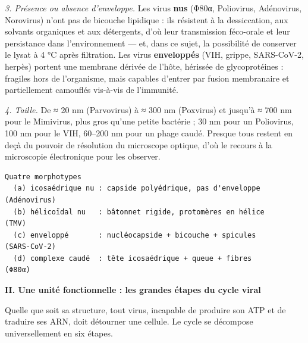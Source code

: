 \documentclass[11pt,a4paper]{article}
\begin{document}
\emph{3. Présence ou absence d'enveloppe.} Les virus \textbf{nus} (Φ80α, Poliovirus, Adénovirus, Norovirus) n'ont pas de bicouche lipidique : ils résistent à la dessiccation, aux solvants organiques et aux détergents, d'où leur transmission féco-orale et leur persistance dans l'environnement --- et, dans ce sujet, la possibilité de conserver le lysat à 4 °C après filtration. Les virus \textbf{enveloppés} (VIH, grippe, SARS-CoV-2, herpès) portent une membrane dérivée de l'hôte, hérissée de glycoprotéines : fragiles hors de l'organisme, mais capables d'entrer par fusion membranaire et partiellement camouflés vis-à-vis de l'immunité.

\emph{4. Taille.} De ≈ 20 nm (Parvovirus) à ≈ 300 nm (Poxvirus) et jusqu'à ≈ 700 nm pour le Mimivirus, plus gros qu'une petite bactérie ; 30 nm pour un Poliovirus, 100 nm pour le VIH, 60--200 nm pour un phage caudé. Presque tous restent en deçà du pouvoir de résolution du microscope optique, d'où le recours à la microscopie électronique pour les observer.

\begin{lstlisting}
Quatre morphotypes
  (a) icosaédrique nu : capside polyédrique, pas d'enveloppe        (Adénovirus)
  (b) hélicoïdal nu   : bâtonnet rigide, protomères en hélice        (TMV)
  (c) enveloppé       : nucléocapside + bicouche + spicules          (SARS-CoV-2)
  (d) complexe caudé  : tête icosaédrique + queue + fibres           (Φ80α)
\end{lstlisting}

\textbf{II. Une unité fonctionnelle : les grandes étapes du cycle viral}

Quelle que soit sa structure, tout virus, incapable de produire son ATP et de traduire ses ARN, doit détourner une cellule. Le cycle se décompose universellement en six étapes.
\end{document}
